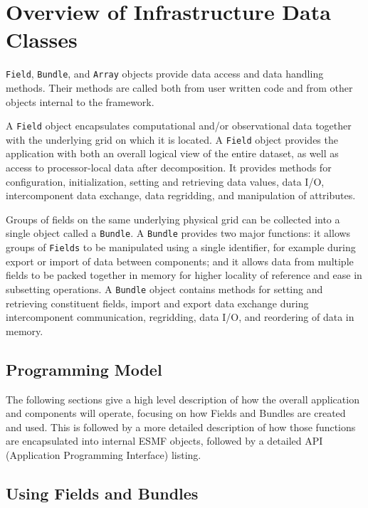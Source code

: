 
\section{Overview of Infrastructure Data Classes}

{\tt Field}, {\tt Bundle}, and {\tt Array} objects 
provide data access and data handling methods.
Their methods are called both from user written
code and from other objects internal to the framework.

A {\tt Field} 
object encapsulates computational and/or observational data together 
with the underlying grid on which it is located.  
A {\tt Field} object provides the
application with both an overall logical view of the entire
dataset, as well as access to processor-local data after decomposition.
It provides methods for configuration, initialization, setting and
retrieving data values, data I/O, intercomponent data 
exchange, data regridding, and manipulation of attributes.

Groups of fields on the same underlying physical grid 
can be collected into a single object called a {\tt Bundle}.  
A {\tt Bundle} provides two major functions: it allows groups of 
{\tt Fields}
to be manipulated using a single identifier, for example during
export or import of data between components; and it allows
data from multiple fields to be packed together in memory 
for higher locality of reference and ease in subsetting operations.
A {\tt Bundle} object contains methods
for setting and retrieving constituent fields, import and export
data exchange during intercomponent communication,
regridding, data I/O, and reordering of data in memory.


\subsection{Programming Model}

The following sections give a high level description of how
the overall application and components will operate,
focusing on how Fields and Bundles are created and used.
This is followed by a more detailed description of how
those functions are encapsulated into internal ESMF 
objects, followed by a detailed API (Application Programming
Interface) listing.

\subsection{Using Fields and Bundles}

